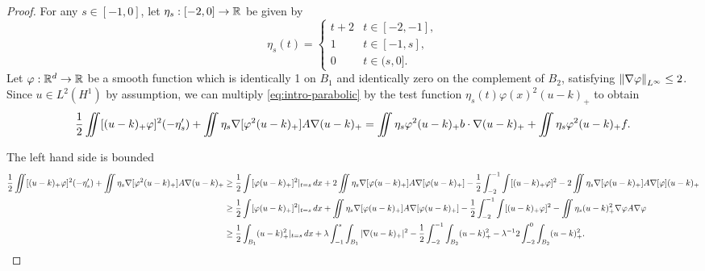 \begin{proof}
For any $s \in [-1,0]$, let $\eta_s:[-2,0]\to \mathbb{R}$ be given by 
\[ \eta_s(t) = \begin{cases}
t+2 & t \in [-2,-1], \\
1 & t \in [-1,s], \\
0 & t \in (s,0].
\end{cases} \]
Let $\varphi: \mathbb{R}^d\to\mathbb{R}$ be a smooth function which is identically 1 on $B_1$ and identically zero on the complement of $B_2$, satisfying $\left\lVert\nabla\varphi\right\rVert_{L^\infty} \leq 2$.  
Since $u \in L^2(H^1)$ by assumption, we can multiply \eqref{eq:intro-parabolic} by the test function $\eta_s(t) \varphi(x)^2 (u-k)_+$ to obtain
\begin{equation} \label{intro-integrate equation against (u-k)_+} 
\frac{1}{2} \iint [(u-k)_+ \varphi]^2 (-\eta_s') + \iint \eta_s \nabla [\varphi^2 (u-k)_+] A \nabla(u-k)_+ = \iint \eta_s \varphi^2(u-k)_+ b \cdot \nabla(u-k)_+ + \iint \eta_s \varphi^2 (u-k)_+ f. 
\end{equation}

The left hand side is bounded
\begin{equation} \label{intro-right hand side of energy} \begin{aligned} 
\frac{1}{2} \iint [(u-k)_+ \varphi]^2 (-\eta_s') + \iint \eta_s \nabla [\varphi^2 (u-k)_+] A \nabla(u-k)_+ &\geq \frac{1}{2}\int [\varphi (u-k)_+]^2|_{t=s} \,dx + 2 \iint \eta_s \nabla[\varphi (u-k)_+] A \nabla[\varphi (u-k)_+] - \frac{1}{2} \int_{-2}^{-1} \int [(u-k)_+ \varphi]^2 - 2 \iint \eta_s \nabla[\varphi (u-k)_+] A \nabla[\varphi] (u-k)_+ 
\\ &\geq \frac{1}{2}\int [\varphi (u-k)_+]^2|_{t=s} \,dx + \iint \eta_s \nabla[\varphi (u-k)_+] A \nabla[\varphi (u-k)_+] - \frac{1}{2} \int_{-2}^{-1} \int [(u-k)_+ \varphi]^2 - \iint \eta_s (u-k)_+^2 \nabla\varphi A \nabla\varphi
\\ & \geq \frac{1}{2}\int_{B_1} (u-k)_+^2|_{t=s} \,dx + \lambda \int_{-1}^s \int_{B_1} |\nabla(u-k)_+|^2 - \frac{1}{2} \int_{-2}^{-1} \int_{B_2} (u-k)_+^2 - \lambda^{-1} 2 \int_{-2}^0 \int_{B_2} (u-k)_+^2.
\end{aligned} \end{equation}


\end{proof}
